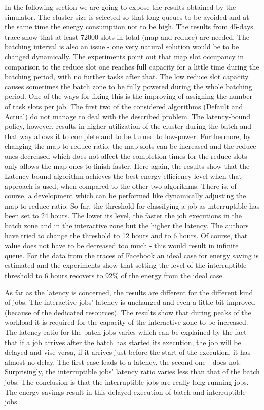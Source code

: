 \documentclass[9pt, a4paper]{article}
\theoremstyle{plain}
\begin{document}
In the following section we are going to expose the results obtained by the simulator.
The cluster size is selected so that long queues to be avoided and at the
same time the energy consumption not to be high. The results from 45-days trace
show that at least 72000 slots in total (map and reduce) are needed. The batching interval is also an
issue - one very natural solution would be to be changed dynamically. The
experiments point out that map slot occupancy in comparison to the reduce slot one
reaches full capacity for a little time during the batching period, with no further
tasks after that. The low reduce slot capacity causes sometimes the batch zone to be fully powered
during the whole batching period. One of the ways for fixing this is the improving of assigning
the number of task slots per job. The first two of the considered algorithms (Default and Actual)
do not manage to deal with the described problem. The latency-bound policy,
however, results in higher utilization of the cluster during the batch and that
way allows it to complete and to be turned to low-power. Furthermore, by changing the map-to-reduce
ratio, the map slots can be increased and the reduce ones decreased which does not
affect the completion times for the reduce slots only allows the map ones to finish
faster. Here again, the results show that the Latency-bound algorithm achieves
the best energy efficiency level when that approach is used, when compared to the other two algorithms. There is, of course,
a development which can be performed like dynamically adjusting the map-to-reduce
ratio. So far, the threshold for classifying a job as interruptible has been set to
24 hours. The lower its level, the faster the job executions in the batch zone and in the interactive
zone but the higher the latency. The authors have tried to change the threshold to
12 hours and to 6 hours. Of course, that value does not have to be decreased too much -
this would result in infinite queue. For the data from the traces of Facebook an ideal case
for energy saving is estimated and the experiments show that setting the level of the
interruptible threshold to 6 hours recovers to 92\% of the energy from the ideal case.

As far as the latency is concerned, the results are different for the different
kind of jobs. The interactive jobs' latency is unchanged and even a little bit
improved (because of the dedicated resources). The results show that during peaks
of the workload it is required for the capacity of the interactive zone to be increased.
The latency ratio for the batch jobs varies which can be explained by the fact that
if a job arrives after the batch has started its execution, the job will be delayed
and vise versa, if it arrives just before the start of the execution, it has almost no delay.
The first case leads to a latency, the second one - does not. Surprisingly, the interruptible
jobs' latency ratio varies less than that of the batch jobs. The conclusion is
that the interruptible jobs are really long running jobs. The energy savings result in this delayed
execution of batch and interruptible jobs.
\end{document}
